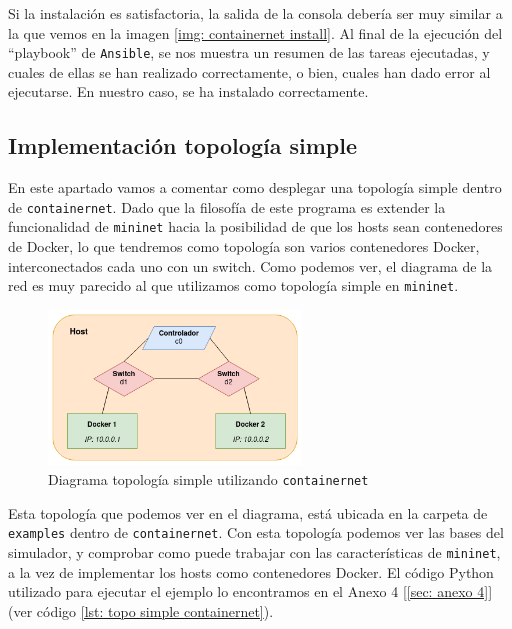 \documentclass[a4paper, oneside, 12pt]{book}
\begin{document}
	\noindent Si la instalación es satisfactoria, la salida de la consola debería ser muy similar a la que vemos en la imagen \ref{img: containernet install}. Al final de la ejecución del ``playbook'' de \texttt{Ansible}, se nos muestra un resumen de las tareas ejecutadas, y cuales de ellas se han realizado correctamente, o bien, cuales han dado error al ejecutarse. En nuestro caso, se ha instalado correctamente.
	
	\subsection{Implementación topología simple}
	\noindent En este apartado vamos a comentar como desplegar una topología simple dentro de \texttt{containernet}. Dado que la filosofía de este programa es extender la funcionalidad de \texttt{mininet} hacia la posibilidad de que los hosts sean contenedores de Docker, lo que tendremos como topología son varios contenedores Docker, interconectados cada uno con un switch. Como podemos ver, el diagrama de la red es muy parecido al que utilizamos como topología simple en \texttt{mininet}.
	
	\begin{figure}[h!]
		\begin{center}
			\includegraphics[width=0.6\textwidth]{img/cn_simple_diag.png}
			\caption{Diagrama topología simple utilizando \texttt{containernet}}
		\end{center}
	\end{figure}

	\pagebreak
	
	\noindent Esta topología que podemos ver en el diagrama, está ubicada en la carpeta de \texttt{examples} dentro de \texttt{containernet}. Con esta topología podemos ver las bases del simulador, y comprobar como puede trabajar con las características de \texttt{mininet}, a la vez de implementar los hosts como contenedores Docker. El código Python utilizado para ejecutar el ejemplo lo encontramos en el Anexo 4 [\ref{sec: anexo 4}] (ver código \ref{lst: topo simple containernet}). \\
	
\end{document}
